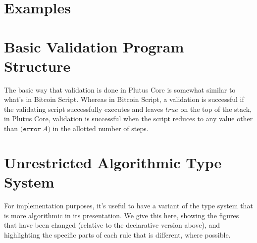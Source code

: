 \documentclass[a4paper]{article}
\newcommand{\keyword}[1]{\texttt{#1}}
\newcommand{\construct}[1]{\texttt{(} #1 \texttt{)}}
\newcommand{\error}[1]{\construct{\keyword{error} ~ #1}}
\begin{document}
\newpage



\section{Examples}



\section{Basic Validation Program Structure}

The basic way that validation is done in Plutus Core is somewhat
similar to what's in Bitcoin Script. Whereas in Bitcoin Script, a
validation is successful if the validating script successfully
executes and leaves $\textit{true}$ on the top of the stack, in Plutus
Core, validation is successful when the script reduces to any value
other than \(\error{A}\) in the allotted number of steps.




%

%

%


%



\section{Unrestricted Algorithmic Type System}

For implementation purposes, it's useful to have a variant of the type system that is more algorithmic in its presentation. We give this here, showing the figures that have been changed (relative to the declarative version above), and highlighting the specific parts of each rule that is different, where possible.


\end{document}
